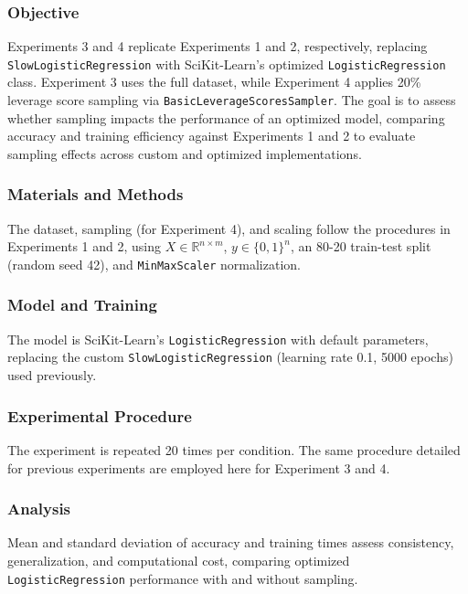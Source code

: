 \documentclass{article}
\theoremstyle{plain}
\theoremstyle{definition}
\theoremstyle{remark}
\begin{document}
\subsubsection{Objective}

Experiments 3 and 4 replicate Experiments 1 and 2, respectively, replacing \texttt{SlowLogisticRegression} with SciKit-Learn's optimized \texttt{LogisticRegression} class. Experiment 3 uses the full dataset, while Experiment 4 applies 20\% leverage score sampling via \texttt{BasicLeverageScoresSampler}. The goal is to assess whether sampling impacts the performance of an optimized model, comparing accuracy and training efficiency against Experiments 1 and 2 to evaluate sampling effects across custom and optimized implementations.

\subsubsection{Materials and Methods}

The dataset, sampling (for Experiment 4), and scaling follow the procedures in Experiments 1 and 2, using $ X \in \mathbb{R}^{n \times m} $, $ y \in \{0, 1\}^n $, an 80-20 train-test split (random seed 42), and \texttt{MinMaxScaler} normalization.

\subsubsection{Model and Training}

The model is SciKit-Learn's \texttt{LogisticRegression} with default parameters, replacing the custom \texttt{SlowLogisticRegression} (learning rate 0.1, 5000 epochs) used previously.

\subsubsection{Experimental Procedure}

The experiment is repeated 20 times per condition. The same procedure detailed for previous experiments are employed here for Experiment 3 and 4.

\subsubsection{Analysis}

Mean and standard deviation of accuracy and training times assess consistency, generalization, and computational cost, comparing optimized \texttt{LogisticRegression} performance with and without sampling.
\end{document}
